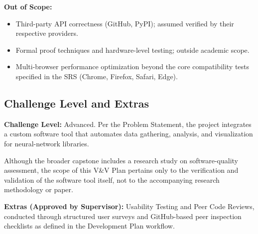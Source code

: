 \documentclass[12pt, titlepage]{article}
\begin{document}
\textbf{Out of Scope:}
\begin{itemize}
  \item Third-party API correctness (GitHub, PyPI); assumed verified by their
  respective providers.

  \item Formal proof techniques and hardware-level testing; outside academic
  scope.

  \item Multi-browser performance optimization beyond the core compatibility
  tests specified in the SRS (Chrome, Firefox, Safari, Edge).
\end{itemize}

\subsection{Challenge Level and Extras}


\textbf{Challenge Level:} Advanced. Per the Problem Statement, the project
integrates a custom software tool that automates data gathering, analysis, and
visualization for neural-network libraries.

Although the broader capstone includes a research study on software-quality
assessment, the scope of this V\&V Plan pertains only to the verification and
validation of the software tool itself, not to the accompanying research
methodology or paper.

\textbf{Extras (Approved by Supervisor):} Usability Testing and Peer Code
Reviews, conducted through structured user surveys and GitHub-based peer
inspection checklists as defined in the Development Plan workflow.
\end{document}
